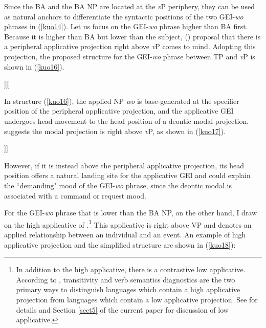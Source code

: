 \documentclass[output=paper,colorlinks,citecolor=brown]{langscibook}
\begin{document}
\ea
\label{kuo15}
  \z
\z

Since the BA and the BA NP are located at the \textit{v}P periphery, they can be used as natural anchors to differentiate the syntactic positions of the two GEI-\textit{wo} phrases in (\ref{kuo14}). Let us focus on the GEI-\textit{wo} phrase higher than BA first. Because it is higher than BA but lower than the subject,  (\citeyear{kim2011, kim2012}) proposal that there is a peripheral applicative projection right above \textit{v}P comes to mind. Adopting this projection, the proposed structure for the GEI-\textit{wo} phrase between TP and \textit{v}P is shown in (\ref{kuo16}).

\ea
\label{kuo16}
\glt [{\scriptsize TP} Ni{\scriptsize i}  [{\scriptsize MPDEO}  gei{\scriptsize j}  [{\scriptsize peripheral ApplP}  wo  t{\scriptsize j}  [{\scriptsize \textit{v}P}  t{\scriptsize i}  ......]]]]\\  
\z

In structure (\ref{kuo16}), the applied NP \textit{wo} is base-generated at the specifier position of the peripheral applicative projection, and the applicative GEI undergoes head movement to the head position of a deontic modal projection. \citet{Tsai2015a} suggests the modal projection is right above \textit{v}P, as shown in (\ref{kuo17}).

\ea
\label{kuo17}
\glt [{\scriptsize TP} Subject{\scriptsize i}..... [{\scriptsize MP{\tiny DEO}}   Deontic modal  [{\scriptsize \textit{v}P}  t{\scriptsize i}  ......]]]\\  
\z

However, if it is instead above the peripheral applicative projection, its head position offers a natural landing site for the applicative GEI and could explain the ``demanding" mood of the GEI-\textit{wo} phrase, since the deontic modal is associated with a command or request mood.\par
For the GEI-\textit{wo} phrase that is lower than the BA NP, on the other hand, I draw on the high applicative of \citet{Pylkkanen2002, Pylkkanen2008}.\footnote{In addition to the high applicative, there is a contrastive low applicative. According to \citet{Pylkkanen2002}, transitivity and verb semantics diagnostics are the two primary ways to distinguish languages which contain a high applicative projection from languages which contain a low applicative projection. See \citet{Pylkkanen2002, Pylkkanen2008} for details and Section \ref{sect5} of the current paper for discussion of  low applicative.} This applicative is right above VP and denotes an applied relationship between an individual and an event. An example of  high applicative projection and the simplified structure are shown in (\ref{kuo18}):
\end{document}
